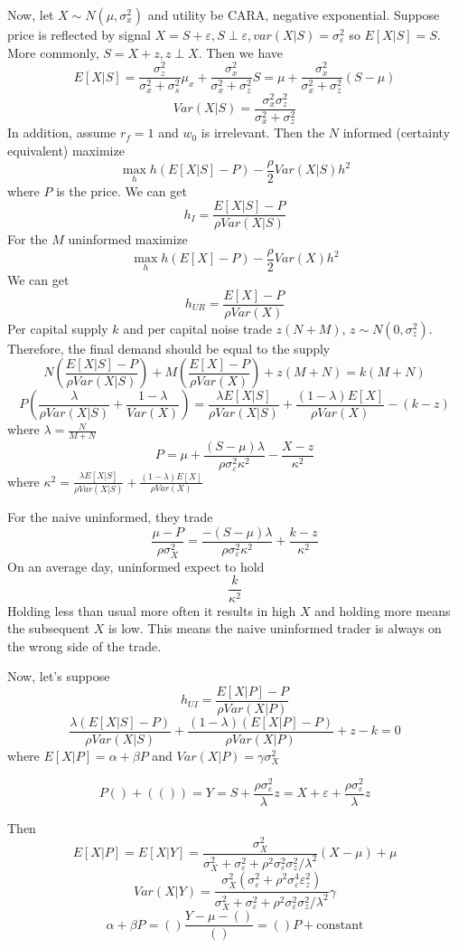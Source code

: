 \documentclass[11pt, a4paper, oneside]{article}
\theoremstyle{definition}
\theoremstyle{proposition}
\theoremstyle{corollary}
\theoremstyle{lemma}
\theoremstyle{theorem}
\begin{document}
Now, let $X \sim N(\mu, \sigma_x^2)$ and utility be CARA, negative exponential. Suppose price is reflected by signal $X = S +\varepsilon, S \perp \varepsilon, var(X|S) = \sigma_{\varepsilon}^2$ so $E[X|S] = S$. More commonly, $S = X + z, z \perp X$. Then we have
$$E[X|S] = \frac{\sigma^2_{z}}{\sigma_x^2+\sigma_s^2} \mu_x + \frac{\sigma_x^2}{\sigma_x^2+\sigma_z^2} S = \mu + \frac{\sigma_x^2}{\sigma_x^2+\sigma_z^2}(S - \mu)$$
$$Var(X|S) = \frac{\sigma_x^2\sigma_z^2}{\sigma_x^2+\sigma_z^2}$$
In addition, assume $r_f = 1$ and $w_0$ is irrelevant. Then the $N$ informed (certainty equivalent) maximize
$$\max_h h(E[X|S] - P) - \frac{\rho}{2}Var(X|S)h^2$$
where $P$ is the price. 
We can get 
$$h_I = \frac{E[X|S] - P}{\rho Var(X|S)}$$
For the $M$ uninformed maximize
$$\max_h h(E[X] - P) - \frac{\rho}{2}Var(X)h^2$$
We can get
$$h_{UR} = \frac{E[X] - P}{\rho Var(X)}$$
Per capital supply $k$ and per capital noise trade $z(N+M)$, $z\sim N(0, \sigma_z^2)$. Therefore, the final demand should be equal to the supply
$$N\left(\frac{E[X|S] - P}{\rho Var(X|S)}\right) + M\left(\frac{E[X] - P}{\rho Var(X)}\right) + z(M+N) = k(M+ N)$$
$$P\left(\frac{\lambda}{\rho Var(X|S)} + \frac{1-\lambda}{Var(X)} \right) = \frac{\lambda E[X|S]}{\rho Var(X|S)} + \frac{(1- \lambda)E[X]}{\rho Var(X)} - (k -z)$$ where $\lambda = \frac{N }{M+N}$
$$P = \mu + \frac{(S-\mu)\lambda}{\rho \sigma^2_{\varepsilon}\kappa^2} - \frac{X - z}{\kappa^2}$$
where $\kappa^2 = \frac{\lambda E[X|S]}{\rho Var(X|S)} + \frac{(1- \lambda)E[X]}{\rho Var(X)}$

For the naive uninformed, they trade 
$$\frac{\mu - P}{\rho \sigma_X^2} = \frac{-(S- \mu)\lambda}{\rho \sigma_{\varepsilon}^2 \kappa^2} + \frac{k- z}{\kappa^2}$$
On an average day, uninformed expect to hold
$$\frac{k}{\kappa^2}$$
Holding less than usual more often it results in high $X$ and holding more means the subsequent $X$ is low. This means the naive uninformed trader is always on the wrong side of the trade.

Now, let's suppose
$$h_{UI} = \frac{E[X|P] - P}{\rho Var(X|P)}$$
$$\frac{\lambda (E[X|S] - P)}{\rho Var(X|S)} + \frac{(1- \lambda) (E[X|P] - P)}{\rho Var(X|P)} + z - k = 0$$
where $E[X|P] = \alpha + \beta P$ and $Var(X|P) = \gamma \sigma_X^2$

$$P() + (()) = Y = S + \frac{\rho \sigma_{\varepsilon}^2}{\lambda} z = X + \varepsilon + \frac{\rho \sigma_{\varepsilon}^2}{\lambda} z$$

Then $$E[X|P] = E[X|Y] = \frac{\sigma_X^2}{\sigma_X^2 + \sigma^2_{\varepsilon}+ \rho^2 \sigma_{\varepsilon}^2\sigma_z^2/\lambda^2}(X-\mu) + \mu$$ 
$$Var(X|Y) = \frac{\sigma_X^2 (\sigma_{\varepsilon}^2 + \rho^2\sigma_{\varepsilon}^4 \varepsilon_z^2)}{\sigma_X^2 + \sigma^2_{\varepsilon}+ \rho^2 \sigma_{\varepsilon}^2\sigma_z^2/\lambda^2}\gamma$$
$$\alpha + \beta P = ()\frac{Y - \mu - ()}{()} = ()P + \text{constant}$$
\end{document}
